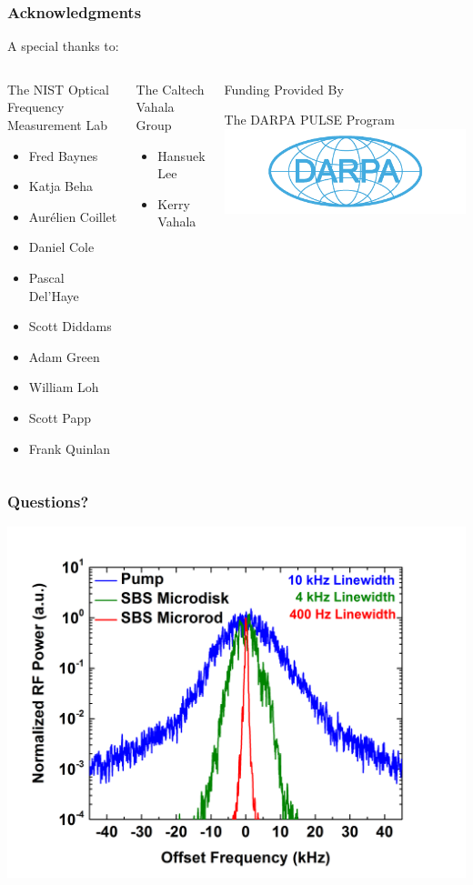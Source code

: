 \documentclass{beamer}
\begin{document}
\begin{frame}\frametitle{Acknowledgments}
A special thanks to:
\begin{columns}
\begin{block}{\centering The NIST Optical Frequency Measurement Lab}
\begin{itemize}
\small
\item Fred Baynes
\item Katja Beha
\item Aur\'{e}lien Coillet
\item Daniel Cole
\item Pascal Del'Haye
\item Scott Diddams
\item Adam Green
\item William Loh
\item Scott Papp
\item Frank Quinlan
\end{itemize}
\end{block}

\begin{block}{\centering The Caltech Vahala Group}
\begin{itemize}
\small
\item Hansuek Lee
\item Kerry Vahala
\end{itemize}
\end{block}

\begin{block}{\centering Funding Provided By}
\begin{center}
\small
The DARPA PULSE Program
\includegraphics[width=1.1\textwidth]{Images/DARPA_logo.png}
\end{center}
\end{block}

\end{columns}
\end{frame}

\begin{frame}\frametitle{Questions?}
\includegraphics[width=1.0\textwidth]{Images/RF_Spectrum_Plot2.png}
\end{frame}
\end{document}
